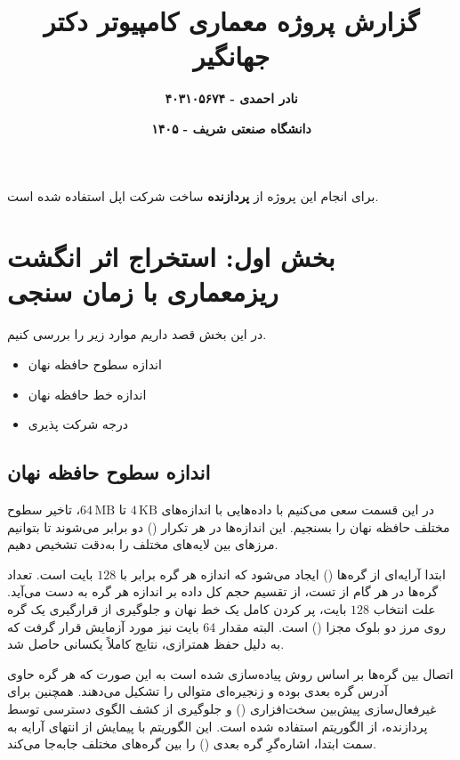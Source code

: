 \documentclass{article}
\title{\textbf{گزارش پروژه معماری کامپیوتر دکتر جهانگیر}} %
\author{\textbf{نادر احمدی - ۴۰۳۱۰۵۶۷۴}} %
\date{\textbf{دانشگاه صنعتی شریف - ۱۴۰۵}} %
\begin{document}
\maketitle %

\vline


\begin{tcolorbox}[colback=blue!5!white, colframe=blue!75!black, title=توضیحات]
	برای انجام این پروژه از \textbf{پردازنده  }ساخت شرکت اپل استفاده شده است.
\end{tcolorbox}


\setcounter{section}{0}
\section{بخش اول: استخراج اثر انگشت ریزمعماری با زمان سنجی} %
در این بخش قصد داریم موارد زیر را بررسی کنیم.
\begin{itemize}
	\item اندازه سطوح حافظه نهان 
	\item اندازه خط حافظه نهان 
	\item درجه شرکت پذیری 
\end{itemize}


\subsection{اندازه سطوح حافظه نهان}

در این قسمت سعی می‌کنیم با داده‌هایی با اندازه‌های $4\,\text{KB}$ تا $64\,\text{MB}$، تاخیر سطوح مختلف حافظه نهان را بسنجیم. این اندازه‌ها در هر تکرار () دو برابر می‌شوند تا بتوانیم مرزهای بین لایه‌های مختلف را به‌دقت تشخیص دهیم.

ابتدا آرایه‌ای از گره‌ها () ایجاد می‌شود که اندازه هر گره برابر با $128$ بایت است. تعداد گره‌ها در هر گام از تست، از تقسیم حجم کل داده بر اندازه هر گره به دست می‌آید. علت انتخاب $128$ بایت، پر کردن کامل یک خط نهان و جلوگیری از قرارگیری یک گره روی مرز دو بلوک مجزا () است. البته مقدار $64$ بایت نیز مورد آزمایش قرار گرفت که به دلیل حفظ همترازی، نتایج کاملاً یکسانی حاصل شد.

اتصال بین گره‌ها بر اساس روش  پیاده‌سازی شده است به این صورت که هر گره حاوی آدرس گره بعدی بوده و زنجیره‌ای متوالی را تشکیل می‌دهند. همچنین برای غیرفعال‌سازی پیش‌بین سخت‌افزاری () و جلوگیری از کشف الگوی دسترسی توسط پردازنده، از الگوریتم  استفاده شده است. این الگوریتم با پیمایش از انتهای آرایه به سمت ابتدا، اشاره‌گرِ گره بعدی () را بین گره‌های مختلف جابه‌جا می‌کند.
\end{document}
